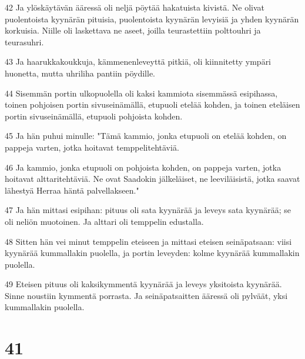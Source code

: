 \par 42 Ja ylöskäytävän ääressä oli neljä pöytää hakatuista kivistä. Ne olivat puolentoista kyynärän pituisia, puolentoista kyynärän levyisiä ja yhden kyynärän korkuisia. Niille oli laskettava ne aseet, joilla teurastettiin polttouhri ja teurasuhri.
\par 43 Ja haarukkakoukkuja, kämmenenleveyttä pitkiä, oli kiinnitetty ympäri huonetta, mutta uhriliha pantiin pöydille.
\par 44 Sisemmän portin ulkopuolella oli kaksi kammiota sisemmässä esipihassa, toinen pohjoisen portin sivuseinämällä, etupuoli etelää kohden, ja toinen eteläisen portin sivuseinämällä, etupuoli pohjoista kohden.
\par 45 Ja hän puhui minulle: "Tämä kammio, jonka etupuoli on etelää kohden, on pappeja varten, jotka hoitavat temppelitehtäviä.
\par 46 Ja kammio, jonka etupuoli on pohjoista kohden, on pappeja varten, jotka hoitavat alttaritehtäviä. Ne ovat Saadokin jälkeläiset, ne leeviläisistä, jotka saavat lähestyä Herraa häntä palvellakseen."
\par 47 Ja hän mittasi esipihan: pituus oli sata kyynärää ja leveys sata kyynärää; se oli neliön muotoinen. Ja alttari oli temppelin edustalla.
\par 48 Sitten hän vei minut temppelin eteiseen ja mittasi eteisen seinäpatsaan: viisi kyynärää kummallakin puolella, ja portin leveyden: kolme kyynärää kummallakin puolella.
\par 49 Eteisen pituus oli kaksikymmentä kyynärää ja leveys yksitoista kyynärää. Sinne noustiin kymmentä porrasta. Ja seinäpatsaitten ääressä oli pylväät, yksi kummallakin puolella.

\chapter{41}

